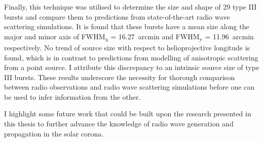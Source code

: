 \begin{abstracts}
Finally, this technique was utilised to determine the size and shape of 29 type III bursts and compare them to predictions from state-of-the-art radio wave scattering simulations. It is found that these bursts have a mean size along the major and minor axis of FWHM\textsubscript{x} = 16.27~arcmin and FWHM\textsubscript{y} = 11.96~arcmin respectively. No trend of source size with respect to helioprojective longitude is found, which is in contrast to predictions from modelling of anisotropic scattering from a point source. I attribute this discrepancy to an intrinsic source size of type III bursts. These results underscore the necessity for thorough comparison between radio observations and radio wave scattering simulations before one can be used to infer information from the other.

I highlight some future work that could be built upon the research presented in this thesis to further advance the knowledge of radio wave generation and propagation in the solar corona.






\end{abstracts}
